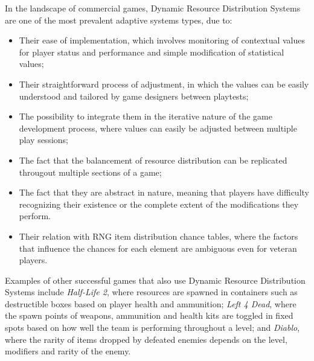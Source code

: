 
In the landscape of commercial games, Dynamic Resource Distribution Systems are one of the most prevalent adaptive systems types, due to:
\begin{itemize} 
    \item{Their ease of implementation, which involves monitoring of contextual values for player status and performance and simple modification of statistical values;}
    \item{Their straightforward process of adjustment, in which the values can be easily understood and tailored by game designers between playtests;}
    \item{The possibility to integrate them in the iterative nature of the game development process, where values can easily be adjusted between multiple play sessions;}
    \item{The fact that the balancement of resource distribution can be replicated througout multiple sections of a game;}
    \item{The fact that they are abstract in nature, meaning that players have difficulty recognizing their existence or the complete extent of the modifications they perform.}
    \item{Their relation with RNG item distribution chance tables, where the factors that influence the chances for each element are ambiguous even for veteran players.}
\end{itemize}


Examples of other successful games that also use Dynamic Resource Distribution Systems include \emph{Half-Life 2}, where resources are spawned in containers such as destructible boxes based on player health and ammunition; \emph{Left 4 Dead}, where the spawn points of weapons, ammunition and health kits are toggled in fixed spots based on how well the team is performing throughout a level; and \emph{Diablo}, where the rarity of items dropped by defeated enemies depends on the level, modifiers and rarity of the enemy.

